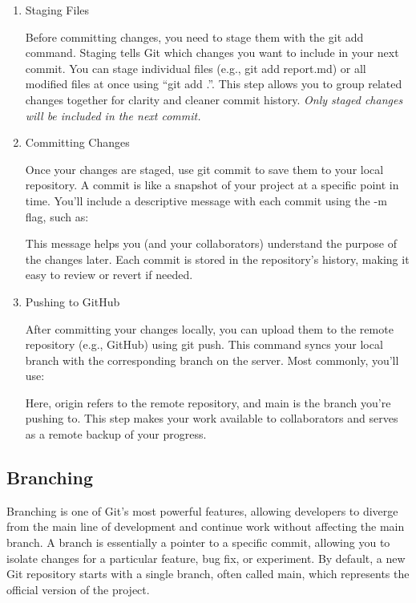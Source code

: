 \begin{enumerate}
\item Staging Files

Before committing changes, you need to stage them with the git add command. Staging tells Git which changes you want to include in your next commit. You can stage individual files (e.g., git add report.md) or all modified files at once using ``git add .''. This step allows you to group related changes together for clarity and cleaner commit history. \emph{Only staged changes will be included in the next commit.}
\begin{terminal}
\end{terminal}

\item Committing Changes

Once your changes are staged, use git commit to save them to your local repository. A commit is like a snapshot of your project at a specific point in time. You’ll include a descriptive message with each commit using the -m flag, such as:
\begin{terminal}
\end{terminal}
This message helps you (and your collaborators) understand the purpose of the changes later. Each commit is stored in the repository’s history, making it easy to review or revert if needed.

\item Pushing to GitHub

After committing your changes locally, you can upload them to the remote repository (e.g., GitHub) using git push. This command syncs your local branch with the corresponding branch on the server. Most commonly, you’ll use:
\begin{terminal}
\end{terminal}
Here, origin refers to the remote repository, and main is the branch you’re pushing to. This step makes your work available to collaborators and serves as a remote backup of your progress.

\end{enumerate}

\subsection*{Branching}
Branching is one of Git’s most powerful features, allowing developers to diverge from the main line of development and continue work without affecting the main branch. A branch is essentially a pointer to a specific commit, allowing you to isolate changes for a particular feature, bug fix, or experiment. By default, a new Git repository starts with a single branch, often called main, which represents the official version of the project.

